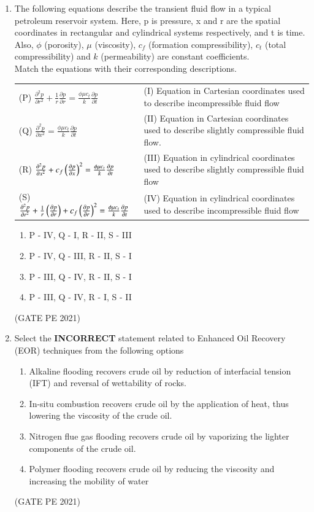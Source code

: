 \documentclass[journal,12pt,onecolumn]{IEEEtran}
\theoremstyle{remark}
\begin{document}
\begin{enumerate}
\item The following equations describe the transient fluid flow in a typical petroleum reservoir system. Here, p is pressure, x and r are the spatial coordinates in rectangular and cylindrical systems respectively, and t is time. Also, $\phi$ (porosity), $\mu$ (viscosity), $c_f$ (formation compressibility), $c_t$ (total compressibility) and $k$ (permeability) are constant coefficients.\\
Match the equations with their corresponding descriptions.\\
\begin{tabular}{ll}
(P) $\frac{\partial^2 p}{\partial r^2}+\frac{1}{r}\frac{\partial p}{\partial r}=\frac{\phi\mu c_t}{k}\frac{\partial p}{\partial t}$ & (I) Equation in Cartesian coordinates used to describe incompressible fluid flow\\
(Q) $\frac{\partial^2p}{\partial x^2}=\frac{\phi \mu c_t}{k}\frac{\partial p}{\partial t}$ & (II)  Equation in Cartesian coordinates used to describe slightly compressible fluid flow.\\
(R) $\frac{\partial^2p}{\partial x^2}+c_f\left(\frac{\partial p}{\partial    x}\right)^2=\frac{\phi \mu c_t}{k}\frac{\partial p}{\partial t}$& (III) Equation in cylindrical coordinates used to describe slightly compressible fluid flow \\
(S) $\frac{\partial^2p}{\partial r^2}+\frac{1}{r}\left(\frac{\partial p}{\partial r}\right)+c_f\left(\frac{\partial p}{\partial r}\right)^2=\frac{\phi \mu c_t}{k}\frac{\partial p}{\partial t}$& (IV) Equation in cylindrical coordinates used to describe incompressible fluid flow \\
\end{tabular}
\begin{enumerate}
    \item P - IV, Q - I, R - II, S - III \\
    \item P - IV, Q - III, R - II, S - I \\
    \item P - III, Q - IV, R - II, S - I\\
    \item P - III, Q - IV, R - I, S - II
\end{enumerate}
\hfill{(GATE PE 2021)}

\item Select the \textbf{INCORRECT} statement related to Enhanced Oil Recovery (EOR) techniques from the following options
\begin{enumerate}
    \item Alkaline flooding recovers crude oil by reduction of interfacial tension (IFT) and reversal of wettability of rocks.
    \item In-situ combustion recovers crude oil by the application of heat, thus lowering the viscosity of the crude oil.
    \item Nitrogen flue gas flooding recovers crude oil by vaporizing the lighter components of the crude oil.
    \item Polymer flooding recovers crude oil by reducing the viscosity and increasing the mobility of water
\end{enumerate}
\hfill{(GATE PE 2021)}


\end{enumerate}
\end{document}
